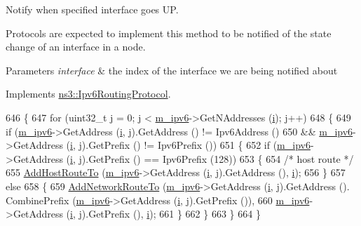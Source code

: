 Notify when specified interface goes UP. 

Protocols are expected to implement this method to be notified of the state change of an interface in a node. 
\begin{DoxyParams}{Parameters}
{\em interface} & the index of the interface we are being notified about \\
\hline
\end{DoxyParams}


Implements \hyperlink{classns3_1_1Ipv6RoutingProtocol_a024dd60e2deb864565ba5993efc38300}{ns3\+::\+Ipv6\+Routing\+Protocol}.


\begin{DoxyCode}
646 \{
647   \textcolor{keywordflow}{for} (uint32\_t j = 0; j < \hyperlink{classns3_1_1Ipv6StaticRouting_aeb0293ac3549a6ca0ba7674d35646fc8}{m\_ipv6}->GetNAddresses (\hyperlink{bernuolliDistribution_8m_a6f6ccfcf58b31cb6412107d9d5281426}{i}); j++)
648     \{
649       \textcolor{keywordflow}{if} (\hyperlink{classns3_1_1Ipv6StaticRouting_aeb0293ac3549a6ca0ba7674d35646fc8}{m\_ipv6}->GetAddress (\hyperlink{bernuolliDistribution_8m_a6f6ccfcf58b31cb6412107d9d5281426}{i}, j).GetAddress () != Ipv6Address ()
650           && \hyperlink{classns3_1_1Ipv6StaticRouting_aeb0293ac3549a6ca0ba7674d35646fc8}{m\_ipv6}->GetAddress (\hyperlink{bernuolliDistribution_8m_a6f6ccfcf58b31cb6412107d9d5281426}{i}, j).GetPrefix () != Ipv6Prefix ())
651         \{
652           \textcolor{keywordflow}{if} (\hyperlink{classns3_1_1Ipv6StaticRouting_aeb0293ac3549a6ca0ba7674d35646fc8}{m\_ipv6}->GetAddress (\hyperlink{bernuolliDistribution_8m_a6f6ccfcf58b31cb6412107d9d5281426}{i}, j).GetPrefix () == Ipv6Prefix (128))
653             \{
654               \textcolor{comment}{/* host route */}
655               \hyperlink{classns3_1_1Ipv6StaticRouting_a9c09d10eb7d7d67c29bdc05bb620c241}{AddHostRouteTo} (\hyperlink{classns3_1_1Ipv6StaticRouting_aeb0293ac3549a6ca0ba7674d35646fc8}{m\_ipv6}->GetAddress (\hyperlink{bernuolliDistribution_8m_a6f6ccfcf58b31cb6412107d9d5281426}{i}, j).GetAddress (), 
      \hyperlink{bernuolliDistribution_8m_a6f6ccfcf58b31cb6412107d9d5281426}{i});
656             \}
657           \textcolor{keywordflow}{else}
658             \{
659               \hyperlink{classns3_1_1Ipv6StaticRouting_ac0c0c9d8e3182295c1cdb4a3d612a2d3}{AddNetworkRouteTo} (\hyperlink{classns3_1_1Ipv6StaticRouting_aeb0293ac3549a6ca0ba7674d35646fc8}{m\_ipv6}->GetAddress (\hyperlink{bernuolliDistribution_8m_a6f6ccfcf58b31cb6412107d9d5281426}{i}, j).GetAddress ().
      CombinePrefix (\hyperlink{classns3_1_1Ipv6StaticRouting_aeb0293ac3549a6ca0ba7674d35646fc8}{m\_ipv6}->GetAddress (\hyperlink{bernuolliDistribution_8m_a6f6ccfcf58b31cb6412107d9d5281426}{i}, j).GetPrefix ()),
660                                  \hyperlink{classns3_1_1Ipv6StaticRouting_aeb0293ac3549a6ca0ba7674d35646fc8}{m\_ipv6}->GetAddress (\hyperlink{bernuolliDistribution_8m_a6f6ccfcf58b31cb6412107d9d5281426}{i}, j).GetPrefix (), 
      \hyperlink{bernuolliDistribution_8m_a6f6ccfcf58b31cb6412107d9d5281426}{i});
661             \}
662         \}
663     \}
664 \}
\end{DoxyCode}


